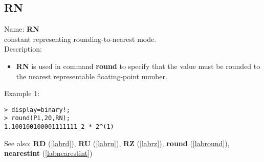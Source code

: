 \subsection{RN}
\label{labrn}
\noindent Name: \textbf{RN}\\
constant representing rounding-to-nearest mode.\\
\noindent Description: \begin{itemize}

\item \textbf{RN} is used in command \textbf{round} to specify that the value must be rounded
   to the nearest representable floating-point number.
\end{itemize}
\noindent Example 1: 
\begin{center}\begin{minipage}{15cm}\begin{Verbatim}[frame=single]
> display=binary!;
> round(Pi,20,RN);
1.100100100001111111_2 * 2^(1)
\end{Verbatim}
\end{minipage}\end{center}
See also: \textbf{RD} (\ref{labrd}), \textbf{RU} (\ref{labru}), \textbf{RZ} (\ref{labrz}), \textbf{round} (\ref{labround}), \textbf{nearestint} (\ref{labnearestint})
